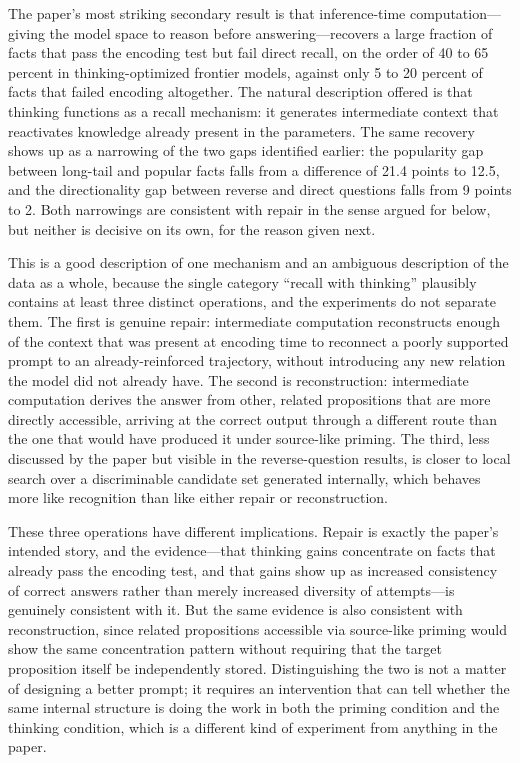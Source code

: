 \documentclass[11pt]{article}
\begin{document}
The paper's most striking secondary result is that inference-time computation---giving the model space to reason before answering---recovers a large fraction of facts that pass the encoding test but fail direct recall, on the order of 40 to 65 percent in thinking-optimized frontier models, against only 5 to 20 percent of facts that failed encoding altogether. The natural description offered is that thinking functions as a recall mechanism: it generates intermediate context that reactivates knowledge already present in the parameters. The same recovery shows up as a narrowing of the two gaps identified earlier: the popularity gap between long-tail and popular facts falls from a difference of 21.4 points to 12.5, and the directionality gap between reverse and direct questions falls from 9 points to 2. Both narrowings are consistent with repair in the sense argued for below, but neither is decisive on its own, for the reason given next.

This is a good description of one mechanism and an ambiguous description of the data as a whole, because the single category ``recall with thinking'' plausibly contains at least three distinct operations, and the experiments do not separate them. The first is genuine repair: intermediate computation reconstructs enough of the context that was present at encoding time to reconnect a poorly supported prompt to an already-reinforced trajectory, without introducing any new relation the model did not already have. The second is reconstruction: intermediate computation derives the answer from other, related propositions that are more directly accessible, arriving at the correct output through a different route than the one that would have produced it under source-like priming. The third, less discussed by the paper but visible in the reverse-question results, is closer to local search over a discriminable candidate set generated internally, which behaves more like recognition than like either repair or reconstruction.

These three operations have different implications. Repair is exactly the paper's intended story, and the evidence---that thinking gains concentrate on facts that already pass the encoding test, and that gains show up as increased consistency of correct answers rather than merely increased diversity of attempts---is genuinely consistent with it. But the same evidence is also consistent with reconstruction, since related propositions accessible via source-like priming would show the same concentration pattern without requiring that the target proposition itself be independently stored. Distinguishing the two is not a matter of designing a better prompt; it requires an intervention that can tell whether the same internal structure is doing the work in both the priming condition and the thinking condition, which is a different kind of experiment from anything in the paper.
\end{document}
